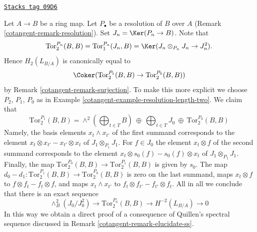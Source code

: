 \begin{remark}
\label{cotangent-remark-elucidate-degree-two}
\href{https://stacks.math.columbia.edu/tag/09D6}{\texttt{Stacks tag 09D6}}

Let $A \to B$ be a ring map. Let $P_\bullet$ be a resolution of
$B$ over $A$ (Remark \ref{cotangent-remark-resolution}).
Set $J_n = \Ker(P_n \to B)$. Note that
$$
\text{Tor}_2^{P_n}(B, B) =
\text{Tor}_1^{P_n}(J_n, B) =
\Ker(J_n \otimes_{P_n} J_n \to J_n^2).
$$
Hence $H_2(L_{B/A})$ is canonically equal to
$$
\Coker(\text{Tor}_2^{P_1}(B, B) \to \text{Tor}_2^{P_0}(B, B))
$$
by Remark \ref{cotangent-remark-surjection}. To make this more explicit we choose
$P_2$, $P_1$, $P_0$ as in Example \ref{cotangent-example-resolution-length-two}.
We claim that
$$
\text{Tor}_2^{P_1}(B, B) =
\wedge^2(\bigoplus\nolimits_{t \in T} B)\ \oplus
\ \bigoplus\nolimits_{t \in T} J_0\ \oplus
\ \text{Tor}_2^{P_0}(B, B)
$$
Namely, the basis elements $x_t \wedge x_{t'}$ of the first summand
corresponds to the element $x_t \otimes x_{t'} - x_{t'} \otimes x_t$
of $J_1 \otimes_{P_1} J_1$. For $f \in J_0$ the element $x_t \otimes f$
of the second summand corresponds to the element
$x_t \otimes s_0(f) - s_0(f) \otimes x_t$ of $J_1 \otimes_{P_1} J_1$.
Finally, the map $\text{Tor}_2^{P_0}(B, B) \to \text{Tor}_2^{P_1}(B, B)$
is given by $s_0$. The map
$d_0 - d_1 : \text{Tor}_2^{P_1}(B, B) \to \text{Tor}_2^{P_0}(B, B)$
is zero on the last summand, maps $x_t \otimes f$ to
$f \otimes f_t - f_t \otimes f$, and maps $x_t \wedge x_{t'}$
to $f_t \otimes f_{t'} - f_{t'} \otimes f_t$. All in all we conclude
that there is an exact sequence
$$
\wedge^2_B(J_0/J_0^2) \to \text{Tor}_2^{P_0}(B, B) \to H^{-2}(L_{B/A}) \to 0
$$
In this way we obtain a direct proof of a consequence of Quillen's spectral
sequence discussed in Remark \ref{cotangent-remark-elucidate-ss}.
\end{remark}

